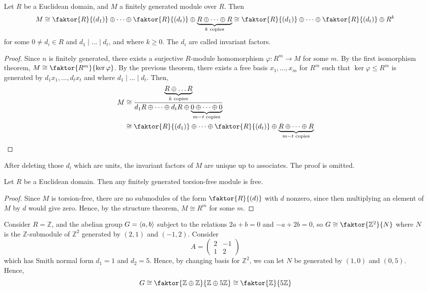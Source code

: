 \begin{theorem}
	Let \( R \) be a Euclidean domain, and \( M \) a finitely generated module over \( R \).
	Then
	\[ M \cong \faktor{R}{(d_1)} \oplus \dots \oplus \faktor{R}{(d_t)} \oplus \underbrace{R \oplus \dots \oplus R}_{k \text{ copies}} \cong \faktor{R}{(d_1)} \oplus \dots \oplus \faktor{R}{(d_t)} \oplus R^k \]
	for some \( 0 \neq d_i \in R \) and \( d_1 \mid \dots \mid d_t \), and where \( k \geq 0 \).
	The \( d_i \) are called invariant factors.
\end{theorem}
\begin{proof}
	Since \( n \) is finitely generated, there exists a surjective \( R \)-module homomorphism \( \varphi \colon R^m \to M \) for some \( m \).
	By the first isomorphism theorem, \( M \cong \faktor{R^m}{\ker \varphi} \).
	By the previous theorem, there exists a free basis \( x_1, \dots, x_m \) for \( R^m \) such that \( \ker \varphi \leq R^m \) is generated by \( d_1 x_1, \dots, d_t x_t \) and where \( d_1 \mid \dots \mid d_t \).
	Then,
	\begin{align*}
		M &\cong \frac{\underbrace{R \oplus \dots R}_{k \text{ copies}}}{d_1 R \oplus \dots \oplus d_t R \oplus \underbrace{0 \oplus \dots \oplus 0}_{m-t \text{ copies}}} \\
		&\cong \faktor{R}{(d_1)} \oplus \dots \oplus \faktor{R}{(d_t)} \oplus \underbrace{R \oplus \dots \oplus R}_{m-t \text{ copies}}
	\end{align*}
\end{proof}
\begin{remark}
	After deleting those \( d_i \) which are units, the invariant factors of \( M \) are unique up to associates.
	The proof is omitted.
\end{remark}
\begin{corollary}
	Let \( R \) be a Euclidean domain.
	Then any finitely generated torsion-free module is free.
\end{corollary}
\begin{proof}
	Since \( M \) is torsion-free, there are no submodules of the form \( \faktor{R}{(d)} \) with \( d \) nonzero, since then multiplying an element of \( M \) by \( d \) would give zero.
	Hence, by the structure theorem, \( M \cong R^m \) for some \( m \).
\end{proof}
\begin{example}
	Consider \( R = \mathbb Z \), and the abelian group \( G = \langle{} a,b \rangle \) subject to the relations \( 2a + b = 0 \) and \( -a + 2b = 0 \), so \( G \cong \faktor{\mathbb Z^2}{N} \) where \( N \) is the \( \mathbb Z \)-submodule of \( \mathbb Z^2 \) generated by \( (2,1) \) and \( (-1,2) \).
	Consider
	\[ A = \begin{pmatrix}
		2 & -1 \\
		1 & 2
	\end{pmatrix} \]
	which has Smith normal form \( d_1 = 1 \) and \( d_2 = 5 \).
	Hence, by changing basis for \( \mathbb Z^2 \), we can let \( N \) be generated by \( (1,0) \) and \( (0,5) \).
	Hence,
	\[ G \cong \faktor{\mathbb Z \oplus \mathbb Z}{\mathbb Z \oplus 5 \mathbb Z} \cong \faktor{\mathbb Z}{5\mathbb Z} \]
\end{example}


